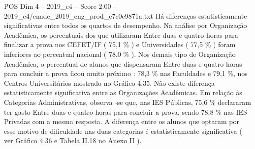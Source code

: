\begin{textsample}{POS Dim 4 – 2019\_c4 – Score 2.00 – 2019\_c4/enade\_2019\_eng\_prod\_c7c0e9871a.txt}
Há diferenças estatisticamente significativas entre todos os quartos de desempenho.
Na análise por Organização Acadêmica, os percentuais dos que utilizaram Entre duas e quatro horas para finalizar a prova nos CEFET/IF ( 75,1 \% ) e Universidades ( 77,5 \% ) foram inferiores ao percentual nacional ( 78,0 \% ).
Nos demais tipo de Organização Acadêmica, o percentual de alunos que dispensaram Entre duas e quatro horas para concluir a prova ficou muito próximo : 78,3 \% nas Faculdades e 79,1 \%, nos Centros Universitários mostrado no Gráfico 4.35.
Não existe diferença estatisticamente significativa entre as Organizações Acadêmicas.
Em relação às Categorias Administrativas, observa -se que, nas IES Públicas, 75,6 \% declararam ter gasto Entre duas e quatro horas para concluir a prova, sendo 78,8 \% nas IES Privadas com a mesma resposta.
A diferença entre os alunos que optaram por esse motivo de dificuldade nas duas categorias é estatisticamente significativa ( ver Gráfico 4.36 e Tabela II.18 no Anexo II ).

\end{textsample}
